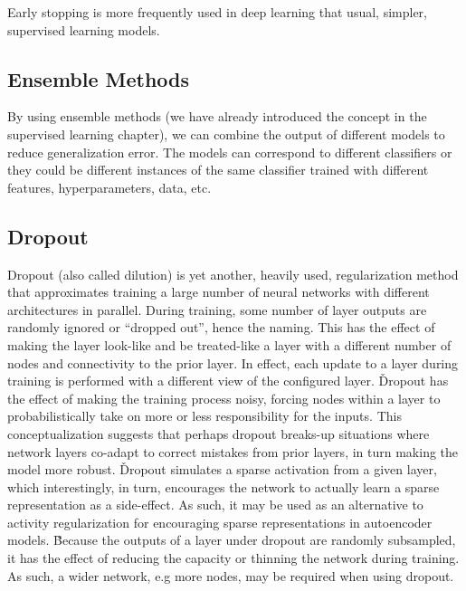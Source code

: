 Early stopping is more frequently used in deep learning that usual, simpler, supervised learning models.

\subsection{Ensemble Methods}

By using ensemble methods (we have already introduced the concept in the supervised learning chapter), we can combine
the output of different models to reduce generalization error. The models can correspond to different classifiers or 
they could be different instances of the same classifier trained with different features, hyperparameters, data, etc.

\subsection{Dropout}

Dropout (also called dilution) is yet another, heavily used, regularization method that approximates training a large
number of neural networks with different architectures in parallel. During training, some number of layer outputs are
randomly ignored or ``dropped out'', hence the naming. This has the effect of making the layer look-like and be 
treated-like a layer with a different number of nodes and connectivity to the prior layer. In effect, each update to 
a layer during training is performed with a different view of the configured layer. \v

Dropout has the effect of making the training process noisy, forcing nodes within a layer to probabilistically take 
on more or less responsibility for the inputs. This conceptualization suggests that perhaps dropout breaks-up 
situations where network layers co-adapt to correct mistakes from prior layers, in turn making the model more robust. \v

Dropout simulates a sparse activation from a given layer, which interestingly, in turn, encourages the network to 
actually learn a sparse representation as a side-effect. As such, it may be used as an alternative to activity 
regularization for encouraging sparse representations in autoencoder models. \v

Because the outputs of a layer under dropout are randomly subsampled, it has the effect of reducing the capacity or 
thinning the network during training. As such, a wider network, e.g more nodes, may be required when using dropout.

